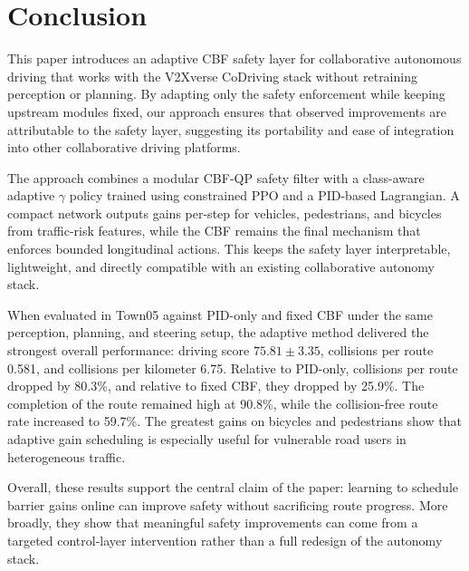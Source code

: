 \section{Conclusion}
\label{Conclusion}

This paper introduces an adaptive CBF safety layer for collaborative autonomous driving that works with the V2Xverse CoDriving stack without retraining perception or planning. By adapting only the safety enforcement while keeping upstream modules fixed, our approach ensures that observed improvements are attributable to the safety layer, suggesting its portability and ease of integration into other collaborative driving platforms.

The approach combines a modular CBF-QP safety filter with a class-aware adaptive $\gamma$ policy trained using constrained PPO and a PID-based Lagrangian. A compact network outputs gains per-step for vehicles, pedestrians, and bicycles from traffic-risk features, while the CBF remains the final mechanism that enforces bounded longitudinal actions. This keeps the safety layer interpretable, lightweight, and directly compatible with an existing collaborative autonomy stack.

When evaluated in Town05 against PID-only and fixed CBF under the same perception, planning, and steering setup, the adaptive method delivered the strongest overall performance: driving score $75.81 \pm 3.35$, collisions per route 0.581, and collisions per kilometer 6.75. Relative to PID-only, collisions per route dropped by 80.3\%, and relative to fixed CBF, they dropped by 25.9\%. The completion of the route remained high at 90.8\%, while the collision-free route rate increased to 59.7\%. The greatest gains on bicycles and pedestrians show that adaptive gain scheduling is especially useful for vulnerable road users in heterogeneous traffic.

Overall, these results support the central claim of the paper: learning to schedule barrier gains online can improve safety without sacrificing route progress. More broadly, they show that meaningful safety improvements can come from a targeted control-layer intervention rather than a full redesign of the autonomy stack.

